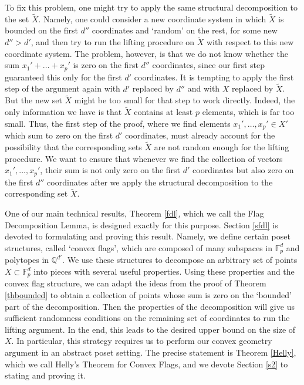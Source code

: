 \documentclass{daj}
\newcommand{\Q}{\mathbb Q}
\newcommand{\FF}{\mathbb F}
\theoremstyle{definition}
\theoremstyle{remark}
\theoremstyle{definition}
\theoremstyle{definition}
\begin{document}
To fix this problem, one might try to apply the same structural decomposition to the set $\tilde X$. Namely, one could consider a new coordinate system in which $\tilde X$ is bounded on the first $d''$ coordinates and `random' on the rest, for some new $d'' > d'$, and then try to run the lifting procedure on $\tilde X$ with respect to this new coordinate system.
The problem, however, is that we do not know whether the sum $x_1'+\ldots+x_p'$ is zero on the first $d''$ coordinates, since our first step guaranteed this only for the first $d'$ coordinates. It is tempting to apply the first step of the argument again with $d'$ replaced by $d''$ and with $X$ replaced by $\tilde X$. But the new set $\tilde X$ might be too small for that step to work directly. Indeed, the only information we have is that $\tilde X$ contains at least $p$ elements, which is far too small.
Thus, the first step of the proof, where we find elements $x_1', \ldots, x_p' \in X'$ which sum to zero on the first $d'$ coordinates, must already account for the possibility that the corresponding sets $\tilde X$ are not random enough for the lifting procedure. We want to ensure that whenever we find the collection of vectors $x_1', \ldots, x_p'$, their sum is not only zero on the first $d'$ coordinates but also zero on the first $d''$ coordinates after we apply the structural decomposition to the corresponding set $\tilde X$.

One of our main technical results, Theorem \ref{fdl}, which we call the Flag Decomposition Lemma, is designed exactly for this purpose. Section \ref{sfdl} is devoted to formulating and proving this result. Namely, we define certain poset structures, called `convex flags', which are composed of many subspaces in $\FF_p^d$ and polytopes in $\Q^{d'}$. We use these structures to decompose an arbitrary set of points $X \subset \FF_p^d$ into pieces with several useful properties.
Using these properties and the convex flag structure, we can adapt the ideas from the proof of Theorem \ref{thbounded} to obtain a collection of points whose sum is zero on the `bounded' part of the decomposition. Then the properties of the decomposition will give us sufficient randomness conditions on the remaining set of coordinates to run the lifting argument. In the end, this leads to the desired upper bound on the size of $X$. In particular, this strategy requires us to perform our convex geometry argument in an abstract poset setting. The precise statement is Theorem \ref{Helly}, which we call Helly's Theorem for Convex Flags, and we devote Section \ref{s2} to stating and proving it.
\end{document}
